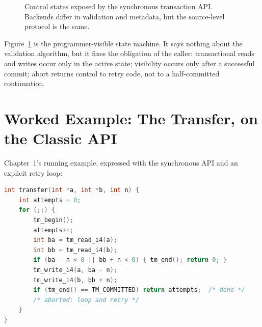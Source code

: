 \begin{figure}[htbp]
\centering
{}
\caption{Control states exposed by the synchronous transaction API. Backends differ in validation and metadata, but the source-level protocol is the same.}
\label{fig:api-state-machine}
\end{figure}

Figure~\ref{fig:api-state-machine} is the programmer-visible state machine. It says nothing about the validation algorithm, but it fixes the obligation of the caller: transactional reads and writes occur only in the active state; visibility occurs only after a successful commit; abort returns control to retry code, not to a half-committed continuation.

\section{Worked Example: The Transfer, on the Classic API}
\label{sec:api-example}

Chapter~1's running example, expressed with the synchronous API and an
explicit retry loop:

\begin{lstlisting}[language=C, caption={transfer on the synchronous API.}, label={lst:api-transfer}]
int transfer(int *a, int *b, int n) {
    int attempts = 0;
    for (;;) {
        tm_begin();
        attempts++;
        int ba = tm_read_i4(a);
        int bb = tm_read_i4(b);
        if (ba - n < 0 || bb + n < 0) { tm_end(); return 0; }
        tm_write_i4(a, ba - n);
        tm_write_i4(b, bb + n);
        if (tm_end() == TM_COMMITTED) return attempts;  /* done */
        /* aborted: loop and retry */
    }
}
\end{lstlisting}

